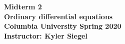 \documentclass[addpoints]{exam}
\begin{document}
\begin{center} 
\Large\textbf{Midterm 2}\\
\large\textbf{Ordinary differential equations}\\
\large\textbf{Columbia University Spring 2020}\\
\large\textbf{Instructor: Kyler Siegel}
\end{center}

 \newcommand*{\TrueFalse}[1]{%
\ifprintanswers
    \ifthenelse{\equal{#1}{T}}{%
        \textbf{TRUE}\hspace*{14pt}False
    }{
        True\hspace*{14pt}\textbf{FALSE}
    }
\else
    {True}\hspace*{20pt}False
\fi
} 

\newlength\TFlengthA
\newlength\TFlengthB
\settowidth\TFlengthA{\hspace*{1.16in}}
\newcommand\TFQuestion[2]{%
    \setlength\TFlengthB{\linewidth}
    \addtolength\TFlengthB{-\TFlengthA}
    \parbox[t]{\TFlengthA}{\TrueFalse{#1}}\parbox[t]{\TFlengthB}{#2}}
 
\end{document}
